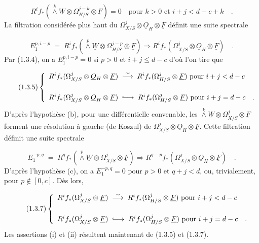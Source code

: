 \begin{equation}\tag{1.3.4}
R^i f_* ( \stackrel{k}{\wedge}\underline{W} \otimes \Omega^{j-k}_{H/S} \otimes \underline{F}) = 0 \quad \mbox{pour } k > 0 \mbox{ et } i+j < d-c+k \quad .
\end{equation}
La filtration considérée plus haut du $\Omega^j_{X/S} \otimes \underline{O}_H \otimes \underline{F}$ définit une suite spectrale

\begin{equation*}
E_1^{p,i-p} \; = \; R^i f_*( \stackrel{p}{\wedge} \underline{W} \otimes \Omega^{j-p}_{H/S} \otimes \underline{F}) \Longrightarrow R^i f_*(\Omega^j_{X/S} \otimes \underline{O}_H \otimes \underline{F}) \quad .
\end{equation*}
Par (1.3.4), on a $E_1^{p,i-p} = 0$ si $p > 0$ et $i+j \leq d-c$ d'où l'on tire que

\begin{equation}\tag{1.3.5}
\left\{ \begin{array}{l} R^i f_*(\Omega^j_{X/S} \otimes \underline{O}_H \otimes \underline{F}) \; \stackrel{\sim}{\longrightarrow} \; R^i f_*(\Omega^j_{H/S} \otimes \underline{F}) \mbox{ pour } i+j < d-c \\[4ex] R^i f_*(\Omega^j_{X/S} \otimes \underline{O}_H \otimes \underline{F}) \; \lhook\joinrel\longrightarrow \; R^i f_*(\Omega^j_{H/S} \otimes \underline{F}) \mbox{ pour } i+j = d-c \quad . \end{array} \right.
\end{equation}
D'après l'hypothèse (b), pour une différentielle convenable, les $\stackrel{k}{\wedge} \underline{W} \otimes \Omega^j_{X/S} \otimes \underline{F}$ forment une résolution à gauche (de Koszul) de $\Omega^j_{X/S} \otimes \underline{O}_H \otimes \underline{F}$. Cette filtration définit une suite spectrale

\begin{equation}\tag{1.3.6}
E_1^{-p,q} \; = \; R^q f_*( \stackrel{p}{\wedge}\underline{W} \otimes \Omega^j_{X/S} \otimes \underline{F}) \Longrightarrow R^{q-p} f_*(\Omega^j_{X/S} \otimes \underline{O}_H \otimes \underline{F}) \quad .
\end{equation}
D'après l'hypothèse (c), on a $E_1^{-p,q} = 0$ pour $p > 0$ et $q+j < d$, ou, trivialement, pour $p \notin [0,c]$. Dès lors,

\begin{equation}\tag{1.3.7}
\left\{ \begin{array}{l} R^i f_*(\Omega^j_{X/S} \otimes \underline{F}) \; \stackrel{\sim}{\longrightarrow} \; R^i f_*(\Omega^j_{H/S} \otimes \underline{F}) \mbox{ pour } i+j < d-c \\[4ex] R^i f_*(\Omega^j_{X/S} \otimes \underline{F}) \; \lhook\joinrel\longrightarrow \; R^i f_*(\Omega^j_{H/S} \otimes \underline{F}) \mbox{ pour } i+j = d-c \quad . \end{array} \right.
\end{equation}
Les assertions (i) et (ii) résultent maintenant de (1.3.5) et (1.3.7).


